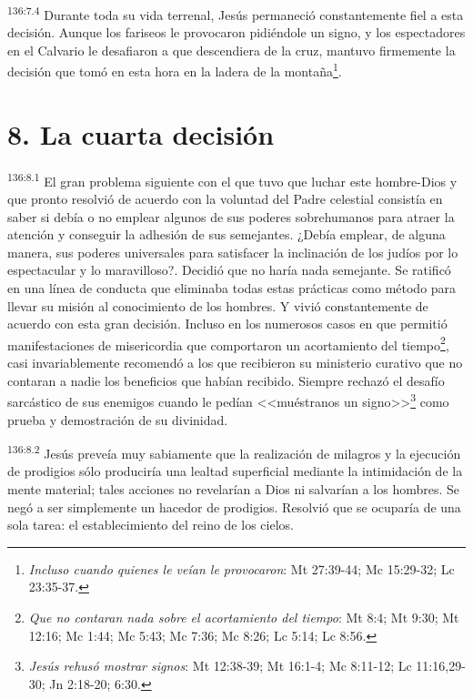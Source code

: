 \par 
\textsuperscript{136:7.4} Durante toda su vida terrenal, Jesús permaneció constantemente fiel a esta decisión. Aunque los fariseos le provocaron pidiéndole un signo, y los espectadores en el Calvario le desafiaron a que descendiera de la cruz, mantuvo firmemente la decisión que tomó en esta hora en la ladera de la montaña\footnote{\textit{Incluso cuando quienes le veían le provocaron}: Mt 27:39-44; Mc 15:29-32; Lc 23:35-37.}.

\section*{8. La cuarta decisión}
\par 
\textsuperscript{136:8.1} El gran problema siguiente con el que tuvo que luchar este hombre-Dios y que pronto resolvió de acuerdo con la voluntad del Padre celestial consistía en saber si debía o no emplear algunos de sus poderes sobrehumanos para atraer la atención y conseguir la adhesión de sus semejantes. ¿Debía emplear, de alguna manera, sus poderes universales para satisfacer la inclinación de los judíos por lo espectacular y lo maravilloso?. Decidió que no haría nada semejante. Se ratificó en una línea de conducta que eliminaba todas estas prácticas como método para llevar su misión al conocimiento de los hombres. Y vivió constantemente de acuerdo con esta gran decisión. Incluso en los numerosos casos en que permitió manifestaciones de misericordia que comportaron un acortamiento del tiempo\footnote{\textit{Que no contaran nada sobre el acortamiento del tiempo}: Mt 8:4; Mt 9:30; Mt 12:16; Mc 1:44; Mc 5:43; Mc 7:36; Mc 8:26; Lc 5:14; Lc 8:56.}, casi invariablemente recomendó a los que recibieron su ministerio curativo que no contaran a nadie los beneficios que habían recibido. Siempre rechazó el desafío sarcástico de sus enemigos cuando le pedían <<muéstranos un signo>>\footnote{\textit{Jesús rehusó mostrar signos}: Mt 12:38-39; Mt 16:1-4; Mc 8:11-12; Lc 11:16,29-30; Jn 2:18-20; 6:30.} como prueba y demostración de su divinidad.

\par 
\textsuperscript{136:8.2} Jesús preveía muy sabiamente que la realización de milagros y la ejecución de prodigios sólo produciría una lealtad superficial mediante la intimidación de la mente material; tales acciones no revelarían a Dios ni salvarían a los hombres. Se negó a ser simplemente un hacedor de prodigios. Resolvió que se ocuparía de una sola tarea: el establecimiento del reino de los cielos.

